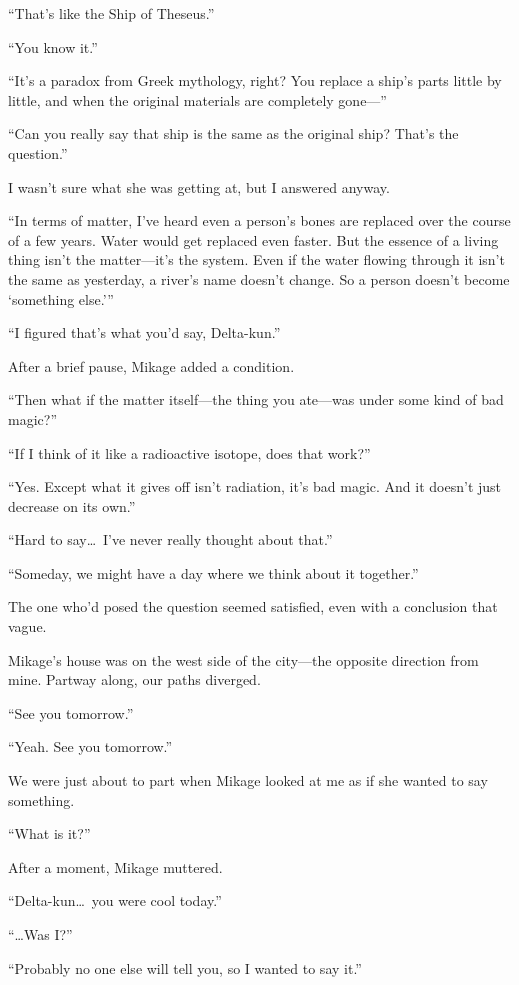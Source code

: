\documentclass[
    a4paper,
    12pt,
    twoside,
    openany,
    UTF8,
    fontset=windows
]{ctexbook}
\begin{document}
``That's like the Ship of Theseus.''

``You know it.''

``It's a paradox from Greek mythology, right? You replace a ship's parts little by little, and when the original materials are completely gone---''

``Can you really say that ship is the same as the original ship? That's the question.''

I wasn't sure what she was getting at, but I answered anyway.

``In terms of matter, I've heard even a person's bones are replaced over the course of a few years. Water would get replaced even faster. But the essence of a living thing isn't the matter---it's the system. Even if the water flowing through it isn't the same as yesterday, a river's name doesn't change. So a person doesn't become `something else.'''

``I figured that's what you'd say, Delta-kun.''

After a brief pause, Mikage added a condition.

``Then what if the matter itself---the thing you ate---was under some kind of bad magic?''

``If I think of it like a radioactive isotope, does that work?''

``Yes. Except what it gives off isn't radiation, it's bad magic. And it doesn't just decrease on its own.''

``Hard to say\dots\ I've never really thought about that.''

``Someday, we might have a day where we think about it together.''

The one who'd posed the question seemed satisfied, even with a conclusion that vague.

Mikage's house was on the west side of the city---the opposite direction from mine. Partway along, our paths diverged.

``See you tomorrow.''

``Yeah. See you tomorrow.''

We were just about to part when Mikage looked at me as if she wanted to say something.

``What is it?''

After a moment, Mikage muttered.

``Delta-kun\dots\ you were cool today.''

``\dots Was I?''

``Probably no one else will tell you, so I wanted to say it.''
\end{document}
